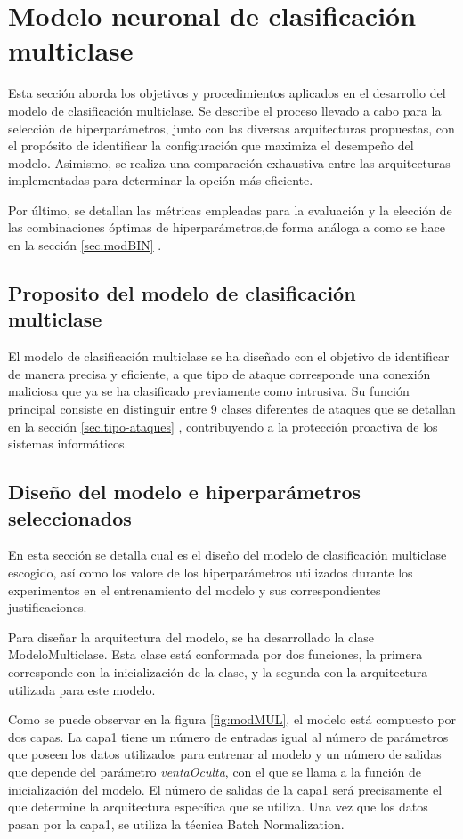 \section{Modelo neuronal de clasificación multiclase}
Esta sección aborda los objetivos y procedimientos aplicados en el desarrollo del modelo de clasificación multiclase. Se describe el proceso llevado a cabo para la selección de hiperparámetros, junto con las diversas arquitecturas propuestas, con el propósito de identificar la configuración que maximiza el desempeño del modelo. Asimismo, se realiza una comparación exhaustiva entre las arquitecturas implementadas para determinar la opción más eficiente.

Por último, se detallan las métricas empleadas para la evaluación y la elección de las combinaciones óptimas de hiperparámetros,de forma análoga a como se hace en la sección \ref{sec.modBIN} .

\subsection{Proposito del modelo de clasificación multiclase}

El modelo de clasificación multiclase se ha diseñado con el objetivo de identificar de manera precisa y eficiente, a que tipo de ataque corresponde una conexión maliciosa que ya se ha clasificado previamente como intrusiva. Su función principal consiste en distinguir entre 9 clases diferentes de ataques que se detallan en la sección \ref{sec.tipo-ataques} , contribuyendo a la protección proactiva de los sistemas informáticos.

\subsection{Diseño del modelo e hiperparámetros seleccionados} \label{sec:disMUL}
En esta sección se detalla cual es el diseño del modelo de clasificación multiclase escogido, así como los valore de los hiperparámetros utilizados durante los experimentos en el entrenamiento del modelo y sus correspondientes justificaciones.

Para diseñar la arquitectura del modelo, se ha desarrollado la clase ModeloMulticlase. Esta clase está conformada por dos funciones, la primera corresponde con la inicialización de la clase, y la segunda con la arquitectura utilizada para este modelo.

Como se puede observar en la figura \ref{fig:modMUL}, el modelo está compuesto por dos capas. La capa1 tiene un número de entradas igual al número de parámetros que poseen los datos utilizados para entrenar al modelo y un número de salidas que depende del parámetro \textit{ventaOculta}, con el que se llama a la función de inicialización del modelo. El número de salidas de la capa1 será precisamente el que determine la arquitectura específica que se utiliza. Una vez que los datos pasan por la capa1, se utiliza la técnica Batch Normalization. 

